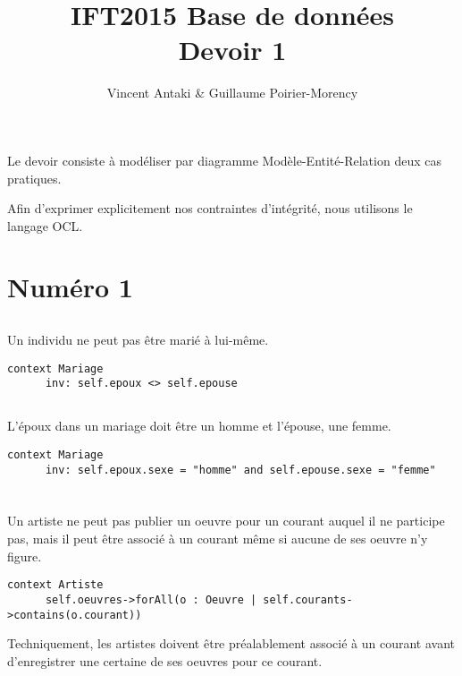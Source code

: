\documentclass{article}
\title{IFT2015 Base de données \\ Devoir 1}
\author{Vincent Antaki \& Guillaume Poirier-Morency}
\begin{document}
  \maketitle

  \abstract
  Le devoir consiste à modéliser par diagramme Modèle-Entité-Relation deux cas
  pratiques.

  Afin d'exprimer explicitement nos contraintes d'intégrité, nous utilisons le
  langage OCL.

  \section{Numéro 1}

  \subsection{}
  Un individu ne peut pas être marié à lui-même.
  \begin{lstlisting}[language=OCL]
  context Mariage
      inv: self.epoux <> self.epouse
  \end{lstlisting}

  \subsection{}
  L'époux dans un mariage doit être un homme et l'épouse, une femme.
  \begin{lstlisting}[language=OCL]
  context Mariage
      inv: self.epoux.sexe = "homme" and self.epouse.sexe = "femme"
  \end{lstlisting}

  \section{}

  \subsection{}
  Un artiste ne peut pas publier un oeuvre pour un courant auquel il ne
  participe pas, mais il peut être associé à un courant même si aucune de ses
  oeuvre n'y figure.
  \begin{lstlisting}[language=OCL]
  context Artiste
      self.oeuvres->forAll(o : Oeuvre | self.courants->contains(o.courant))
  \end{lstlisting}

  Techniquement, les artistes doivent être préalablement associé à un courant
  avant d'enregistrer une certaine de ses oeuvres pour ce courant.

  \subsection{}
\end{document}
